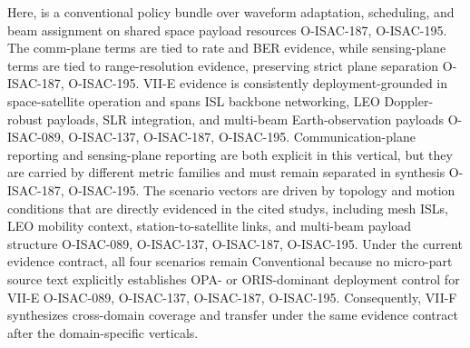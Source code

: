 {}\markdownRendererSoftLineBreak
{}\markdownRendererParagraphSeparator
{}Here,  is a conventional policy bundle over waveform adaptation, scheduling, and beam assignment on shared space payload resources O-ISAC-187, O-ISAC-195. The comm-plane terms are tied to rate and BER evidence, while sensing-plane terms are tied to range-resolution evidence, preserving strict plane separation O-ISAC-187, O-ISAC-195.\markdownRendererParagraphSeparator
{}\markdownRendererInterblockSeparator
{}\markdownRendererUlBeginTight
\markdownRendererUlItem VII-E evidence is consistently deployment-grounded in space-satellite operation and spans ISL backbone networking, LEO Doppler-robust payloads, SLR integration, and multi-beam Earth-observation payloads O-ISAC-089, O-ISAC-137, O-ISAC-187, O-ISAC-195.\markdownRendererUlItemEnd 
\markdownRendererUlItem Communication-plane reporting and sensing-plane reporting are both explicit in this vertical, but they are carried by different metric families and must remain separated in synthesis O-ISAC-187, O-ISAC-195.\markdownRendererUlItemEnd 
\markdownRendererUlItem The scenario vectors are driven by topology and motion conditions that are directly evidenced in the cited studys, including mesh ISLs, LEO mobility context, station-to-satellite links, and multi-beam payload structure O-ISAC-089, O-ISAC-137, O-ISAC-187, O-ISAC-195.\markdownRendererUlItemEnd 
\markdownRendererUlItem Under the current evidence contract, all four scenarios remain Conventional because no micro-part source text explicitly establishes OPA- or ORIS-dominant deployment control for VII-E O-ISAC-089, O-ISAC-137, O-ISAC-187, O-ISAC-195.\markdownRendererUlItemEnd 
\markdownRendererUlEndTight \markdownRendererInterblockSeparator
{}Consequently, VII-F synthesizes cross-domain coverage and transfer under the same evidence contract after the domain-specific verticals.\markdownRendererInterblockSeparator
{}
\markdownRendererSectionEnd 
\markdownRendererSectionEnd \markdownRendererSectionBegin
{}\markdownRendererInterblockSeparator
{}\markdownRendererSectionBegin
{}\markdownRendererInterblockSeparator
